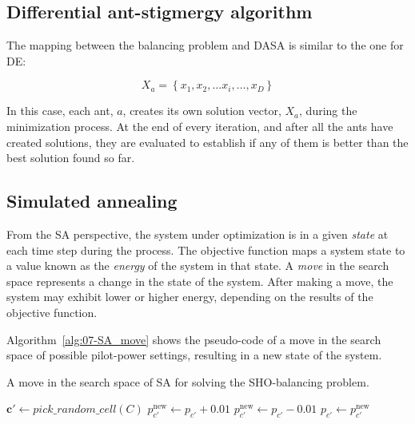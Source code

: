 \subsection{Differential ant-stigmergy algorithm}

The mapping between the balancing problem and DASA is similar to the
one for DE:

\begin{equation}
X_{a}=\left\{ x_{1},x_{2},\ldots x_{i},\ldots,x_{D}\right\} \label{eq:07-DASA_mapping}
\end{equation}


\noindent In this case, each ant, $a$, creates its own solution vector,
$X_{a}$, during the minimization process. At the end of every iteration,
and after all the ants have created solutions, they are evaluated
to establish if any of them is better than the best solution found
so far.


\subsection{Simulated annealing}

From the SA perspective, the system under optimization is in a given
\emph{state} at each time step during the process. The objective function
maps a system state to a value known as the \emph{energy} of the system
in that state. A \emph{move} in the search space represents a change
in the state of the system. After making a move, the system may exhibit
lower or higher energy, depending on the results of the objective
function.

Algorithm~\ref{alg:07-SA_move} shows the pseudo-code of a move in
the search space of possible pilot-power settings, resulting in a
new state of the system.

\begin{algorithm}
\centering

\caption{A move in the search space of SA for solving the SHO-balancing problem.\label{alg:07-SA_move}}


\begin{algorithmic}
\State $\mathbf{c'} \gets pick\_random\_cell(C)$
\Repeat
		\State $p_{c'}^{\mathrm{new}} \gets p_{c'}+0.01$
	\Else
		\State $p_{c'}^{\mathrm{new}} \gets p_{c'}-0.01$
	\EndIf
{}
\State $p_{c'} \gets p_{c'}^{\mathrm{new}}$
\end{algorithmic}
\end{algorithm}


